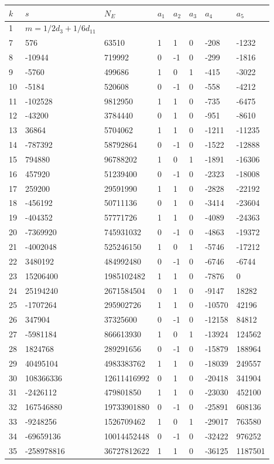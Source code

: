 \documentclass{amsart}
\begin{document}
\begin{longtable}{|l|l|l|lllll|}
\hline
$k$ & $s$ & $N_E$ & $a_1$ & $a_2$ & $a_3$ & $a_4$ & $a_5$\\
\hline
1&$m=1/2d_{3}+1/6d_{11}$&&\multicolumn{5}{c|}{}\\
7&576&63510&1&1&0&-208&-1232\\
8&-10944&719992&0&-1&0&-299&-1816\\
9&-5760&499686&1&0&1&-415&-3022\\
10&-5184&520608&0&-1&0&-558&-4212\\
11&-102528&9812950&1&1&0&-735&-6475\\
12&-43200&3784440&0&1&0&-951&-8610\\
13&36864&5704062&1&1&0&-1211&-11235\\
14&-787392&58792864&0&-1&0&-1522&-12888\\
15&794880&96788202&1&0&1&-1891&-16306\\
16&457920&51239400&0&-1&0&-2323&-18008\\
17&259200&29591990&1&1&0&-2828&-22192\\
18&-456192&50711136&0&1&0&-3414&-23604\\
19&-404352&57771726&1&1&0&-4089&-24363\\
20&-7369920&745931032&0&-1&0&-4863&-19372\\
21&-4002048&525246150&1&0&1&-5746&-17212\\
22&3480192&484992480&0&-1&0&-6746&-6744\\
23&15206400&1985102482&1&1&0&-7876&0\\
24&25194240&2671584504&0&1&0&-9147&18282\\
25&-1707264&295902726&1&1&0&-10570&42196\\
26&347904&37325600&0&-1&0&-12158&84812\\
27&-5981184&866613930&1&0&1&-13924&124562\\
28&1824768&289291656&0&-1&0&-15879&188964\\
29&40495104&4983383762&1&1&0&-18039&249557\\
30&108366336&12611416992&0&1&0&-20418&341904\\
31&-2426112&479801850&1&1&0&-23030&452100\\
32&167546880&19733901880&0&-1&0&-25891&608136\\
33&-9248256&1526709462&1&0&1&-29017&763580\\
34&-69659136&10014452448&0&-1&0&-32422&976252\\
35&-258978816&36727812622&1&1&0&-36125&1187501\\

\end{longtable}
\end{document}
